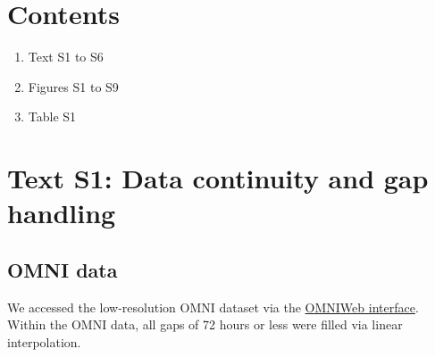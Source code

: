 \documentclass{agujournal2018}
\begin{document}
\renewcommand{\thetable}{S\arabic{table}}
\renewcommand{\thefigure}{S\arabic{figure}}







%
%

\section*{Contents}
\begin{enumerate}
\item Text S1 to S6
\item Figures S1 to S9
\item Table S1
\end{enumerate}

\section*{Text S1: Data continuity and gap handling}\label{sec:datahandling}

\subsection*{OMNI data}\label{sec:OMNIsupp}
We accessed the low-resolution OMNI dataset via the \href{https://omniweb.gsfc.nasa.gov/ow.html}{OMNIWeb interface}. Within the OMNI data, all gaps of 72 hours or less were filled via linear interpolation.
\end{document}
